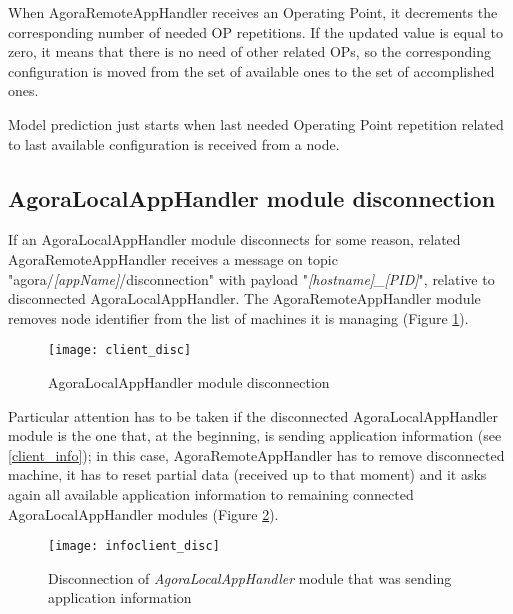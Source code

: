 When AgoraRemoteAppHandler receives an Operating Point, it decrements the corresponding number of needed OP repetitions. If the updated value is equal to zero, it means that there is no need of other related OPs, so the corresponding configuration is moved from the set of available ones to the set of accomplished ones.

Model prediction just starts when last needed Operating Point repetition related to last available configuration is received from a node.





\subsection{AgoraLocalAppHandler module disconnection}\label{client_disc}

If an AgoraLocalAppHandler module disconnects for some reason, related Agora\-Remote\-App\-Handler receives a message on topic "agora\slash{}\textit{[appName]}\slash{}dis\-con\-nec\-tion" with payload "\textit{[hostname]\_[PID]}", relative to disconnected AgoraLocalAppHandler. The AgoraRemote\-App\-Handler module removes node identifier from the list of machines it is managing (Figure \ref{fig::locDisc}).

\begin{figure}[ht]

    \centering
    \texttt{[image: client\_disc]}
    \caption{AgoraLocalAppHandler module disconnection}

    \label{fig::locDisc}
    
\end{figure}

Particular attention has to be taken if the disconnected AgoraLocalAppHandler module is the one that, at the beginning, is sending application information (see \ref{client_info}); in this case, AgoraRemoteAppHandler has to remove disconnected machine, it has to reset partial data (received up to that moment) and it asks again all available application information to remaining connected Agora\-Local\-App\-Handler modules (Figure \ref{fig::locInfoDisc}).

\begin{figure}[hb]

    \centering
    \texttt{[image: infoclient\_disc]}
    \caption{Disconnection of \textit{AgoraLocalAppHandler} module that was sending application information}

    \label{fig::locInfoDisc}
    
\end{figure}





